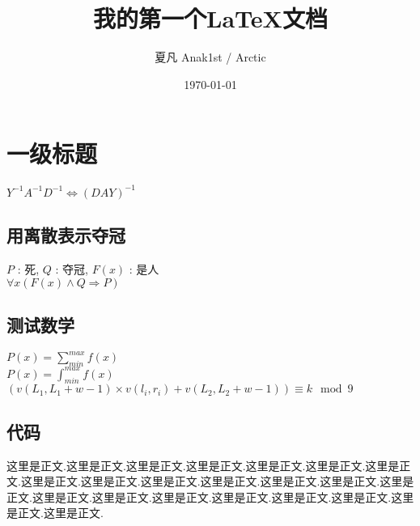 \documentclass[12pt, a4paper, oneside]{article}
\title{我的第一个\LaTeX 文档}
\author{夏凡 Anak1st / Arctic}
\date{\today}
\begin{document}
\maketitle

\section{一级标题}

$ Y^{-1} A^{-1} D^{-1} \iff (DAY)^{-1} $

\subsection{用离散表示夺冠}
\begin{center}
    $P$ : 死, $Q$ : 夺冠, $F(x)$ : 是人 \\
    ${\forall}x(F(x) \wedge Q \Rightarrow P)$
\end{center}

\subsection{测试数学}
\begin{center}
    $P(x)=\sum_{min}^{max}f(x)$ \\
    $P(x)=\int_{min}^{max}f(x)$ \\
    $(v(L_1, L_1 + w - 1) \times v(l_i, r_i) + v(L_2, L_2 + w - 1)) \equiv k \mod 9$
\end{center}

\newpage
\subsection{代码}


这里是正文.这里是正文.这里是正文.这里是正文.这里是正文.这里是正文.这里是正文.这里是正文.这里是正文.这里是正文.这里是正文.这里是正文.这里是正文.这里是正文.这里是正文.这里是正文.这里是正文.这里是正文.这里是正文.这里是正文.这里是正文.这里是正文.
\end{document}
